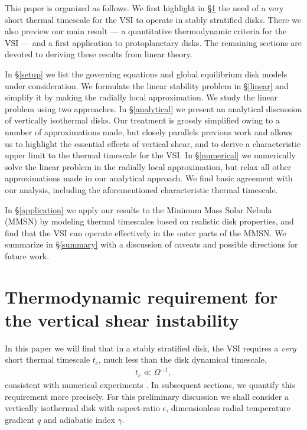 \documentclass[iop]{emulateapj}
\begin{document}
This paper is organized as follows. We first highlight in
\S\ref{vsi_require} the need of a very short thermal timescale for the
VSI to operate in stably stratified disks. There we also preview our
main result --- a quantitative thermodynamic criteria for the VSI ---
and a first application to protoplanetary disks. The remaining sections
are devoted to deriving these results from linear theory. 

In \S\ref{setup} we list the governing equations and global
equilibrium disk models under   
consideration. We formulate the linear stability problem in 
\S\ref{linear} and simplify it by making the radially local
approximation. We study the linear problem using two approaches. In
\S\ref{analytical} we present an analytical discussion of vertically
isothermal disks. Our treatment is grossly simplified owing to a
number of approximations made, but closely parallels previous work and 
allows us to highlight the essential effects of vertical shear, and to
derive a characteristic upper limit to the thermal timescale for the
VSI. In \S\ref{numerical} we numerically
solve the linear problem in the radially local approximation, but
relax all other approximations made in our analytical approach.    
We find basic agreement with our analysis, including
the aforementioned characteristic thermal timescale. 

In
\S\ref{application} we apply our results to the Minimum Mass
Solar Nebula (MMSN) by modeling thermal 
timescales based on realistic disk properties, and find that the VSI
can operate effectively in the outer parts of the MMSN. We summarize in
\S\ref{summary} with a discussion of caveats and possible directions
for future work.  



\section{Thermodynamic requirement for the vertical shear instability}\label{vsi_require}    
In this paper we will find that in a stably stratified disk, the VSI
requires a \emph{very} short thermal timescale $t_c$, much less than the
disk dynamical timescale,
\begin{align}
  t _c \ll \Omega^{-1},  
\end{align}
consistent with numerical experiments \citep{nelson13}. In subsequent
sections, we quantify this requirement more 
precisely. For this preliminary discussion we shall 
consider a vertically isothermal disk with aspect-ratio $\epsilon$,
dimensionless radial temperature gradient $q$ and adiabatic index
$\gamma$.   
\end{document}
